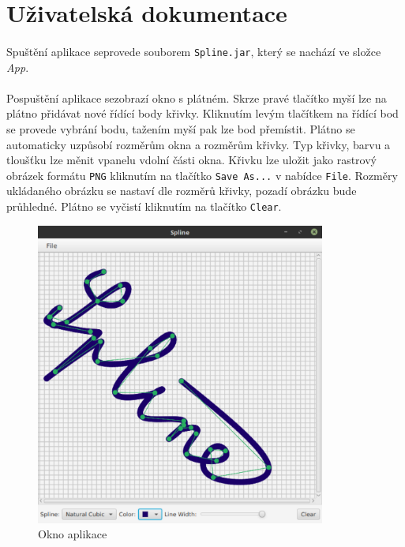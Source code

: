 \documentclass[12pt]{scrartcl}
\begin{document}
\newpage
\section{Uživatelská dokumentace}

\paragraph{}
Spuštění aplikace se\nobreakspace provede souborem \texttt{Spline.jar}, který se nachází ve složce \emph{App}.

\paragraph{}
Po\nobreakspace spuštění aplikace se\nobreakspace zobrazí okno s plátném. Skrze pravé tlačítko myší lze na plátno přidávat nové řídící body křivky. Kliknutím levým tlačítkem na řídící bod se provede vybrání bodu, tažením myší pak lze bod přemístit. Plátno se automaticky uzpůsobí rozměrům okna a rozměrům křivky. Typ křivky, barvu a tloušťku lze měnit v\nobreakspace panelu v\nobreakspace dolní části okna. Křivku lze uložit jako rastrový obrázek formátu \texttt{PNG} kliknutím na tlačítko \texttt{Save As...} v nabídce \texttt{File}. Rozměry ukládaného obrázku se nastaví dle rozměrů křivky, pozadí obrázku bude průhledné. Plátno se vyčistí kliknutím na tlačítko \texttt{Clear}.

\begin{figure}[!ht]
	\centering
	\includegraphics[width=0.85\textwidth,natwidth=1,natheight=1]{app_gui.pdf}
	\caption{Okno aplikace}
\end{figure}
\end{document}
